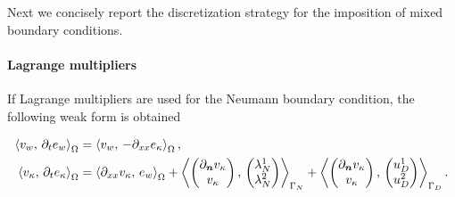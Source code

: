 Next we concisely report the discretization strategy for the imposition of mixed boundary conditions.

\paragraph{Lagrange multipliers}
If Lagrange multipliers are used for the Neumann boundary condition, the following weak form is obtained

\begin{equation}
\begin{aligned}
\inner[\Omega]{v_w}{\partial_t e_w} &= \inner[\Omega]{v_w}{-\partial_{xx} e_\kappa} , \\
\inner[\Omega]{v_\kappa}{\partial_t e_\kappa} &= \inner[\Omega]{\partial_{xx} v_\kappa}{ e_w}  + \inner[\Gamma_N]{\begin{pmatrix}
	\partial_{\bm{n}} v_\kappa \\
	v_\kappa \\
	\end{pmatrix}}{\begin{pmatrix}
	\lambda_{N}^1 \\
	\lambda_{N}^2 \\
	\end{pmatrix}} + \inner[\Gamma_D]{\begin{pmatrix}
	\partial_{\bm{n}} v_\kappa \\
	v_\kappa \\
	\end{pmatrix}}{\begin{pmatrix}
	u_{D}^1 \\
	u_{D}^2 \\
	\end{pmatrix}}.
\end{aligned}
\end{equation}

